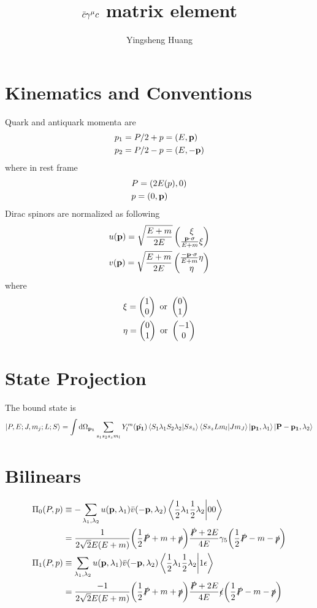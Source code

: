 \documentclass{article}
\title{$\bar c\gamma^{\mu} c$ matrix element}
\author{Yingsheng Huang}
\begin{document}
\maketitle
\section{Kinematics and Conventions}
Quark and antiquark momenta are
\begin{align}
    &p_1=P/2+p=(E,\vb{p})\\
    &p_2=P/2-p=(E,-\vb{p})
\end{align}
where in rest frame
\begin{align}
    &P=(2E(p),0)\\
    &p=(0,\vb{p})
\end{align}
Dirac spinors are normalized as following
\begin{align}
    &u(\vb{p})=\sqrt{\frac{E+m}{2E}}\pmqty{\xi\\\frac{\vb{p}\cdot\sigma}{E+m}\xi}\\
    &v(\vb{p})=\sqrt{\frac{E+m}{2E}}\pmqty{\frac{-\vb{p}\cdot\sigma}{E+m}\eta\\\eta}
\end{align}
where
\begin{align}
    &\xi=\pmqty{1\\0}\text{ or }\pmqty{0\\1}\\
    &\eta=\pmqty{0\\1}\text{ or }\pmqty{-1\\0}
\end{align}
\section{State Projection}
The bound state is\cite{Weinberg2015}
\begin{align}
    \ket{P,E;J,m_j;L;S}=\int\dd\Omega_{\vb{p_1}}\sum_{s_1s_2s_zm_l}Y_l^m(\hat{\vb{p_1}})\braket{S_1\lambda_{1}S_2\lambda_{2}}{Ss_z}\braket{Ss_zLm_l}{Jm_J}\ket{\vb{p_1},\lambda_{1}}\ket{\vb{P-p_1},\lambda_{2}}
\end{align}
\section{Bilinears\cite{Bodwin:2002hg}}
\begin{align}
    \Pi_0(P,p)&\equiv-\sum_{\lambda_1,\lambda_2}u(\vb{p},\lambda_1)\bar v(-\vb{p},\lambda_2)\braket{\frac{1}{2}\lambda_1\frac{1}{2}\lambda_2}{00}\\
    &=\frac{1}{2\sqrt{2}E(E+m)}\pqty{\frac{1}{2}\slashed P+m+\slashed p}\frac{\slashed P+2E}{4E}\gamma_5\pqty{\frac{1}{2}\slashed P-m-\slashed p}\\
    \Pi_1(P,p)&\equiv\sum_{\lambda_1,\lambda_2}u(\vb{p},\lambda_1)\bar v(-\vb{p},\lambda_2)\braket{\frac{1}{2}\lambda_1\frac{1}{2}\lambda_2}{1\epsilon}\\
    &=\frac{-1}{2\sqrt{2}E(E+m)}\pqty{\frac{1}{2}\slashed P+m+\slashed p}\frac{\slashed P+2E}{4E}\slashed\epsilon\pqty{\frac{1}{2}\slashed P-m-\slashed p}
\end{align}
\end{document}
